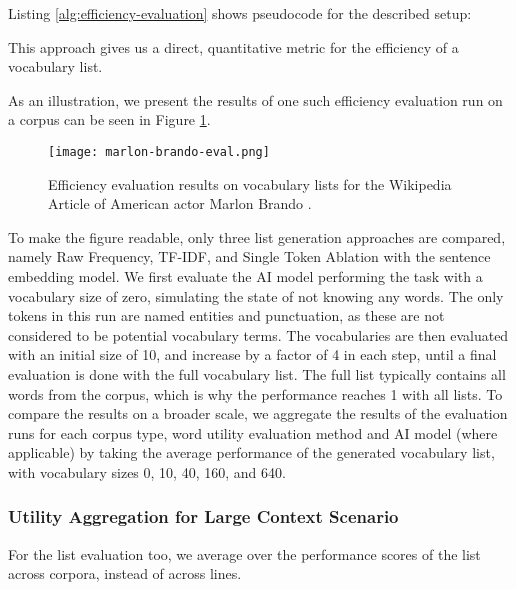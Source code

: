 Listing \ref{alg:efficiency-evaluation} shows pseudocode for the described setup:




This approach gives us a direct, quantitative metric for the efficiency of a vocabulary list.

As an illustration, we present the results of one such efficiency evaluation run on a corpus can be seen in Figure \ref{fig:marlon-brando-eval}.
\begin{figure}[H]
	\centering
	\texttt{[image: marlon-brando-eval.png]}
	\caption{Efficiency evaluation results on vocabulary lists for the Wikipedia Article of American actor Marlon Brando \protect\footnotemark.}
	\label{fig:marlon-brando-eval}
\end{figure}


To make the figure readable, only three list generation approaches are compared, namely Raw Frequency, TF-IDF, and Single Token Ablation with the sentence embedding model.
We first evaluate the AI model performing the task with a vocabulary size of zero, simulating the state of not knowing any words.
The only tokens in this run are named entities and punctuation, as these are not considered to be potential vocabulary terms.
The vocabularies are then evaluated with an initial size of 10, and increase by a factor of 4 in each step, until a final evaluation is done with the full vocabulary list.
The full list typically contains all words from the corpus, which is why the performance reaches 1 with all lists.
To compare the results on a broader scale, we aggregate the results of the evaluation runs for each corpus type, word utility evaluation method and AI model (where applicable) by taking the average performance of the generated vocabulary list, with vocabulary sizes 0, 10, 40, 160, and 640.

\subsubsection{Utility Aggregation for Large Context Scenario}
For the list evaluation too, we average over the performance scores of the list across corpora, instead of across lines.

